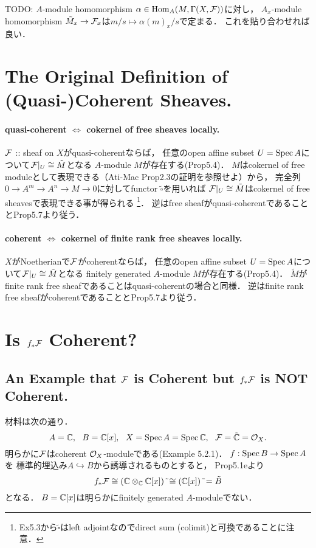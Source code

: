 \documentclass[a4paper]{jsarticle}
\begin{document}
    TODO:
    $A$-module homomorphism $\alpha \in \operatorname{Hom}_A(M,\Gamma(X,\mathcal{F}))$に対し，
    $A_x$-module homomorphism $\tilde{M}_x \to \mathcal{F}_x$は$m/s \mapsto \alpha(m)_x/s$で定まる．
    これを貼り合わせれば良い．

\section{The Original Definition of (Quasi-)Coherent Sheaves.} %
    \paragraph{quasi-coherent $\iff$ cokernel of free sheaves locally.}
    $\mathcal{F}$ :: sheaf on $X$がquasi-coherentならば，
    任意のopen affine subset $U=\operatorname{Spec} A$について$\mathcal{F}|_U \cong \tilde{M}$となる
    $A$-module $M$が存在する(Prop5.4)．
    $M$はcokernel of free moduleとして表現できる（Ati-Mac Prop2.3の証明を参照せよ）から，
    完全列$0 \to A^m \to A^n \to M \to 0$に対してfunctor $\tilde{\square}$を用いれば
    $\mathcal{F}|_U \cong \tilde{M}$はcokernel of free sheavesで表現できる事が得られる
    \footnote{Ex5.3から$\tilde{\square}$はleft adjointなのでdirect sum (colimit)と可換であることに注意．}．
    逆はfree sheafがquasi-coherentであることとProp5.7より従う．

    \paragraph{coherent $\iff$ cokernel of finite rank free sheaves locally.}
    $X$がNoetherianで$\mathcal{F}$がcoherentならば，
    任意のopen affine subset $U=\operatorname{Spec} A$について$\mathcal{F}|_U \cong \tilde{M}$となる
    finitely generated $A$-module $M$が存在する(Prop5.4)．
    $\tilde{M}$がfinite rank free sheafであることはquasi-coherentの場合と同様．
    逆はfinite rank free sheafがcoherentであることとProp5.7より従う．

\section{Is $f_* \mathcal{F}$ Coherent?} %
    \subsection{An Example that $\mathcal{F}$ is Coherent but $f_*\mathcal{F}$ is NOT Coherent.}
    材料は次の通り．
    \[ A=\mathbb{C},~~ B=\mathbb{C}[x],~~ X=\operatorname{Spec} A=\operatorname{Spec} \mathbb{C},~~ \mathcal{F}=\tilde{\mathbb{C}}=\mathcal{O}_X. \]
    明らかに$\mathcal{F}$はcoherent $\mathcal{O}_X$-moduleである(Example 5.2.1)．
    $f: \operatorname{Spec} B \to \operatorname{Spec} A$を
    標準的埋込み$A \hookrightarrow B$から誘導されるものとすると，
    Prop5.1eより
    \[ f_* \mathcal{F} \cong (\mathbb{C} \otimes_{\mathbb{C}} \mathbb{C}[x])~\tilde{} \cong (\mathbb{C}[x])~\tilde{}=\tilde{B} \]
    となる．
    $B=\mathbb{C}[x]$は明らかにfinitely generated $A$-moduleでない．
\end{document}
